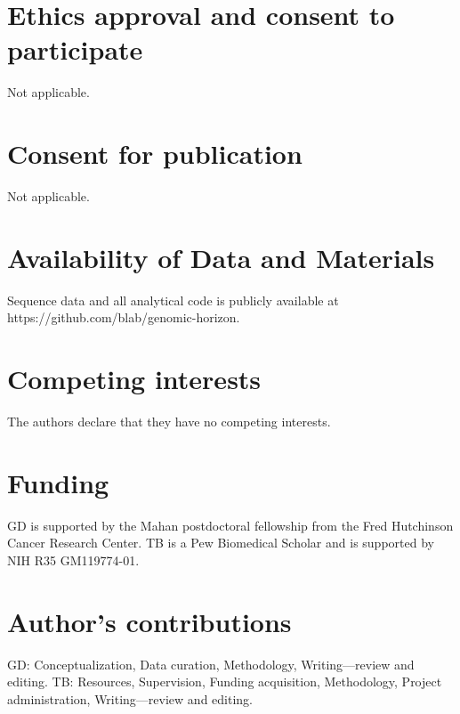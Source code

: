 \documentclass{bmcart}
\begin{document}

\begin{backmatter}

\section*{Ethics approval and consent to participate}
Not applicable.


\section*{Consent for publication}
Not applicable.

\section*{Availability of Data and Materials}
Sequence data and all analytical code is publicly available at https://github.com/blab/genomic-horizon.

\section*{Competing interests}
The authors declare that they have no competing interests.

\section*{Funding}
GD is supported by the Mahan postdoctoral fellowship from the Fred Hutchinson Cancer Research Center.
TB is a Pew Biomedical Scholar and is supported by NIH R35 GM119774-01.

\section*{Author's contributions}
GD: Conceptualization, Data curation, Methodology, Writing—review and editing.
TB: Resources, Supervision, Funding acquisition, Methodology, Project administration, Writing—review and editing.


\end{backmatter}
\end{document}
